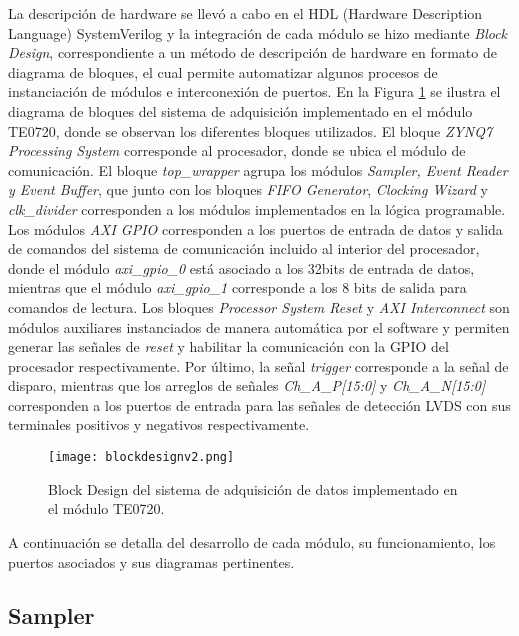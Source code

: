 	La descripción de hardware se llevó a cabo en el HDL (Hardware Description Language) SystemVerilog y la integración de cada módulo se hizo mediante \textit{Block Design}, correspondiente a un método de descripción de hardware en formato de diagrama de bloques, el cual permite automatizar algunos procesos de instanciación de módulos e interconexión de puertos. En la Figura \ref{fig:blockdesign}  se ilustra el diagrama de bloques del sistema de adquisición implementado en el módulo TE0720, donde se observan los diferentes bloques utilizados. El bloque \textit{ZYNQ7 Processing System} corresponde al procesador, donde se ubica el módulo de comunicación. El bloque \textit{top\_wrapper} agrupa los módulos \textit{Sampler, Event Reader y Event Buffer}, que junto con los bloques \textit{FIFO Generator}, \textit{Clocking Wizard} y \textit{clk\_divider} corresponden a los módulos implementados en la lógica programable. Los módulos \textit{AXI GPIO} corresponden a los puertos de entrada de datos y salida de comandos del sistema de comunicación incluido al interior del procesador, donde el módulo \textit{axi\_gpio\_0} está asociado a los 32bits de entrada de datos, mientras que el módulo \textit{axi\_gpio\_1} corresponde a los 8 bits de salida para comandos de lectura. Los bloques \textit{Processor System Reset} y \textit{AXI Interconnect} son módulos auxiliares instanciados de manera automática por el software y permiten generar las señales de \textit{reset} y habilitar la comunicación con la GPIO del procesador respectivamente. Por último, la señal \textit{trigger} corresponde a la señal de disparo, mientras que los arreglos de señales \textit{Ch\_A\_P[15:0]} y \textit{Ch\_A\_N[15:0]} corresponden a los puertos de entrada para las señales de detección LVDS con sus terminales positivos y negativos respectivamente.
	
	\begin{figure}[H]
		\centering
		\texttt{[image: blockdesignv2.png]}
		\caption{Block Design del sistema de adquisición de datos implementado en el módulo TE0720.}
		\label{fig:blockdesign}
	\end{figure}
	
	A continuación se detalla del desarrollo de cada módulo, su funcionamiento, los puertos asociados y sus diagramas pertinentes. 
	
	\subsection{Sampler}
	\label{sec:sampling}
	

